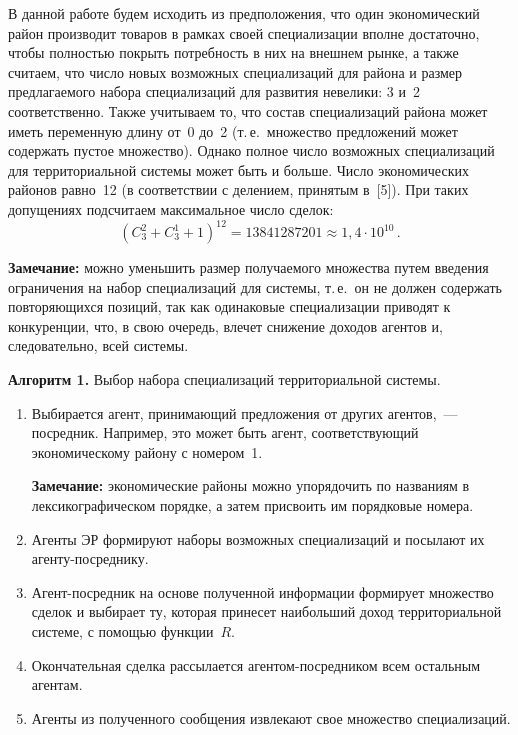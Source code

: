 \begin{multicols}{2}
  В данной работе будем исходить из предположения, что один экономический 
район производит товаров в рамках своей специализации вполне достаточно, 
чтобы полностью покрыть потребность в них на внешнем рынке, а также 
считаем, что чис\-ло новых возможных специализаций для района и размер 
предлагаемого набора специализаций для развития невелики: 3 и~2 
соответственно. Также учитываем то, что состав специализаций района может 
иметь переменную длину от~0 до~2 (т.\,е.\ множество предложений может 
содержать пустое множество). Однако полное число возможных специализаций 
для территориальной системы может быть и больше. Число экономических 
районов равно~12 (в соответствии с делением, принятым в~[5]). При 
таких допущениях подсчитаем максимальное число сделок: 
  $$
  (C_3^2+C_3^1+1)^{12}=13841287201\approx 1{,}4\cdot 10^{10}\,.
  $$

\noindent
\textbf{Замечание:} можно уменьшить размер получаемого множества путем 
введения ограничения на набор специализаций для системы, т.\,е.\ он не должен 
содержать повторяющихся позиций, так как одинаковые специализации 
приводят к конкуренции, что, в свою очередь, влечет снижение доходов агентов 
и, следовательно, всей системы.

\medskip

\noindent
\textbf{Алгоритм 1.} Выбор набора специализаций территориальной системы.
\begin{enumerate}[1.]
\item Выбирается агент, принимающий предложения от других агентов,~--- 
посредник. Например, это может быть агент, соответствующий 
экономическому району с номером~1. 

\smallskip

\noindent
\textbf{Замечание:} экономические районы можно упорядочить по названиям в 
лексикографическом порядке, а затем присвоить им порядковые номера.
\item Агенты ЭР формируют наборы возможных специализаций и посылают их 
аген\-ту-по\-сред\-ни\-ку.
\item Агент-посредник на основе полученной информации формирует 
множество сделок и выбирает ту, которая принесет наибольший доход 
территориальной системе, с помощью функции~$R$.
\item Окончательная сделка рассылается аген\-том-по\-сред\-ни\-ком всем 
остальным агентам.
\item Агенты из полученного сообщения извлекают свое множество 
специализаций.
\end{enumerate}


\end{multicols}
